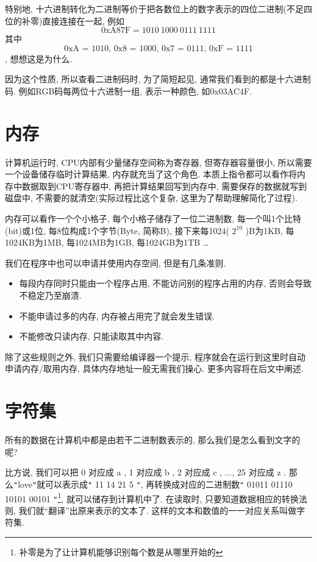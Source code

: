         特别地, 十六进制转化为二进制等价于把各数位上的数字表示的四位二进制(不足四位的补零)直接连接在一起, 例如 \[ \textrm{0xA87F} = 1010 \ 1000 \ 0111 \ 1111 \] 其中 \[ \textrm{0xA = 1010, 0x8 = 1000, 0x7 = 0111, 0xF = 1111} \], 想想这是为什么.

        因为这个性质, 所以查看二进制码时, 为了简短起见, 通常我们看到的都是十六进制码. 例如RGB码每两位十六进制一组, 表示一种颜色, 如0x03AC4F.

    \section{内存}
        计算机运行时, CPU内部有少量储存空间称为寄存器, 但寄存器容量很小, 所以需要一个设备储存临时计算结果, 内存就充当了这个角色. 本质上指令都可以看作将内存中数据取到CPU寄存器中, 再把计算结果回写到内存中, 需要保存的数据就写到磁盘中, 不需要的就清空(实际过程比这个复杂, 这里为了帮助理解简化了过程). 

        内存可以看作一个个小格子, 每个小格子储存了一位二进制数, 每一个叫1个比特(bit)或1位, 每8位构成1个字节(Byte, 简称B), 接下来每1024( $ 2 ^ {10} $ )B为1KB, 每1024KB为1MB, 每1024MB为1GB, 每1024GB为1TB \ldots

        我们在程序中也可以申请并使用内存空间, 但是有几条准则.
        \begin{itemize}
            \item 每段内存同时只能由一个程序占用, 不能访问别的程序占用的内存, 否则会导致不稳定乃至崩溃.
            \item 不能申请过多的内存, 内存被占用完了就会发生错误.
            \item 不能修改只读内存, 只能读取其中内容.
        \end{itemize}

        除了这些规则之外, 我们只需要给编译器一个提示, 程序就会在运行到这里时自动申请内存/取用内存, 具体内存地址一般无需我们操心. 更多内容将在后文中阐述.

    \section{字符集} \label{字符集}
        所有的数据在计算机中都是由若干二进制数表示的, 那么我们是怎么看到文字的呢? 
        
        比方说, 我们可以把 0 对应成 a , 1 对应成 b , 2 对应成 c , ..., 25 对应成 z . 那么\texttt{"}love\texttt{"}就可以表示成\texttt{"} 11 14 21 5 \texttt{"}, 再转换成对应的二进制数\texttt{"} 01011 01110 10101 00101 \texttt{"}\footnote{补零是为了让计算机能够识别每个数是从哪里开始的}, 就可以储存到计算机中了. 在读取时, 只要知道数据相应的转换法则, 我们就``翻译''出原来表示的文本了. 这样的文本和数值的一一对应关系叫做字符集.

